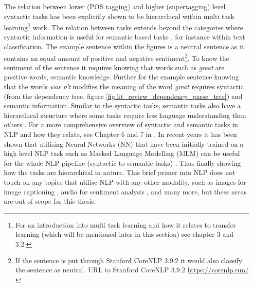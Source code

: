 The relation between lower (POS tagging) and higher (supertagging) level syntactic tasks has been explicitly shown to be hierarchical within \citet{sogaard-goldberg-2016-deep} multi task learning\footnote{For an introduction into multi task learning and how it relates to transfer learning (which will be mentioned later in this section) see \citep{ruder2019neural} chapter 3 and 3.2.} work. The relation between tasks extends beyond the categories where syntactic information is useful for semantic based tasks \citep{hashimoto-etal-2017-joint}, for instance within text classification. The example sentence within the figures is a neutral sentence as it contains an equal amount of positive and negative sentiment\footnote{If the sentence is put through Stanford CoreNLP 3.9.2 it would also classify the sentence as neutral. URL to Stanford CoreNLP 3.9.2 \url{https://corenlp.run/}}. To know the sentiment of the sentence it requires knowing that words such as \textit{great} are positive words, semantic knowledge. Further for the example sentence knowing that the words \textit{was n't} modifies the meaning of the word \textit{great} requires syntactic (from the dependency tree, figure \ref{fig:lit_review_dependency_parse_tree}) and semantic information. Similar to the syntactic tasks, semantic tasks also have a hierarchical structure where some tasks require less language understanding than others \citep{sanh2019hierarchical}. For a more comprehensive overview of syntactic and semantic tasks in NLP and how they relate, see Chapter 6 and 7 in \citet{goldberg2017neural}. In recent years it has been shown that utilising Neural Networks (NN) that have been initially trained on a high level NLP task such as Masked Language Modelling (MLM) \citep{devlin-etal-2019-bert} can be useful for the whole NLP pipeline (syntactic to semantic tasks) \citep{tenney-etal-2019-bert}. Thus finally showing how the tasks are hierarchical in nature. This brief primer into NLP does not touch on any topics that utilise NLP with any other modality, such as images for image captioning \citep{Karpathy_2015_CVPR}, audio for sentiment analysis \citep{raaijmakers-etal-2008-multimodal}, and many more, but these areas are out of scope for this thesis.

